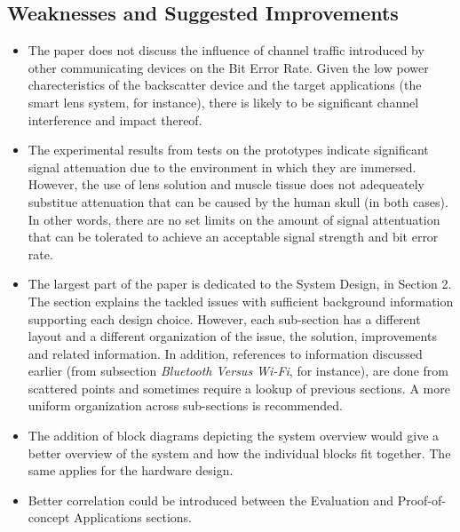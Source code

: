 \documentclass[a4paper]{article}
\begin{document}
\subsection{Weaknesses and Suggested Improvements}
\begin{itemize}
\item The paper does not discuss the influence of channel traffic introduced by other communicating devices on the Bit Error Rate. Given the low power charecteristics of the backscatter device and the target applications (the smart lens system, for instance), there is likely to be significant channel interference and impact thereof.
\item The experimental results from tests on the prototypes indicate significant signal attenuation due to the environment in which they are immersed. However, the use of lens solution and muscle tissue does not adequeately substitue attenuation that can be caused by the human skull (in both cases). In other words, there are no set limits on the amount of signal attentuation that can be tolerated to achieve an acceptable signal strength and bit error rate.
\item The largest part of the paper is dedicated to the System Design, in Section 2. The section explains the tackled issues with sufficient background information supporting each design choice. However, each sub-section has a different layout and a different organization of the issue, the solution, improvements and related information. In addition, references to information discussed earlier (from subsection \textit{Bluetooth Versus Wi-Fi}, for instance), are done from scattered points and sometimes require a lookup of previous sections. A more uniform organization across sub-sections is recommended.
\item The addition of block diagrams depicting the system overview would give a better overview of the system and how the individual blocks fit together. The same applies for the hardware design.
\item Better correlation could be introduced between the Evaluation and Proof-of-concept Applications sections.
\end{itemize}
\end{document}
